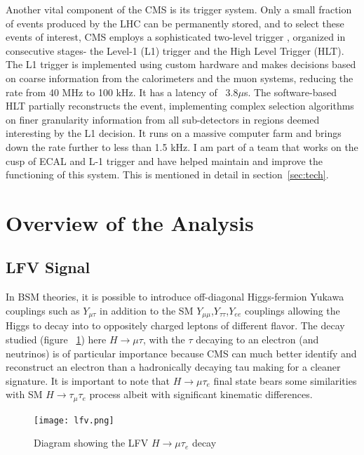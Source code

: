 \documentclass[a4paper,11pt]{article}
\begin{document}
Another vital component of the CMS is its trigger system. Only a small fraction of events produced by the LHC can be permanently stored, and to select these events of interest, CMS employs a sophisticated two-level trigger , organized in consecutive stages- the Level-1 (L1) trigger and the High Level Trigger (HLT). The L1 trigger is implemented using custom hardware and makes decisions based on coarse information from the calorimeters and the muon systems, reducing the rate from 40 MHz to 100 kHz. It has a latency of ~3.8$\mu$s. The software-based HLT partially reconstructs the event, implementing complex selection algorithms on finer granularity information from all sub-detectors in regions deemed interesting by the L1 decision. It runs on a massive computer farm and brings down the rate further to less than 1.5 kHz. I am part of a team that works on the cusp of ECAL and L-1 trigger and have helped maintain and improve the functioning of this system. This is mentioned in detail in section~\ref{sec:tech}.


\section {Overview of the Analysis}
\subsection{LFV Signal}
In BSM theories, it is possible to introduce off-diagonal Higgs-fermion Yukawa couplings such as $Y_{\mu\tau}$ in addition to the SM $Y_{\mu\mu}$,$Y_{\tau\tau}$,$Y_{ee}$ couplings allowing the Higgs to decay into to oppositely charged leptons of different flavor.  The decay studied (figure ~\ref{fig:c}) here $H\rightarrow \mu\tau$, with the $\tau$ decaying to an electron (and neutrinos) is of particular importance because CMS can much better identify and reconstruct an electron than a hadronically decaying tau making for a cleaner signature. It is important to note that $H\rightarrow \mu\tau_{e}$ final state bears some similarities with SM $H\rightarrow \tau_{\mu}\tau_{e}$ process albeit with significant kinematic differences.
\begin{figure}
  \centering
    \texttt{[image: lfv.png]}
  \caption{\label{fig:c} Diagram showing the LFV $H\rightarrow \mu \tau_{e}$ decay  }
\end{figure}
\end{document}
